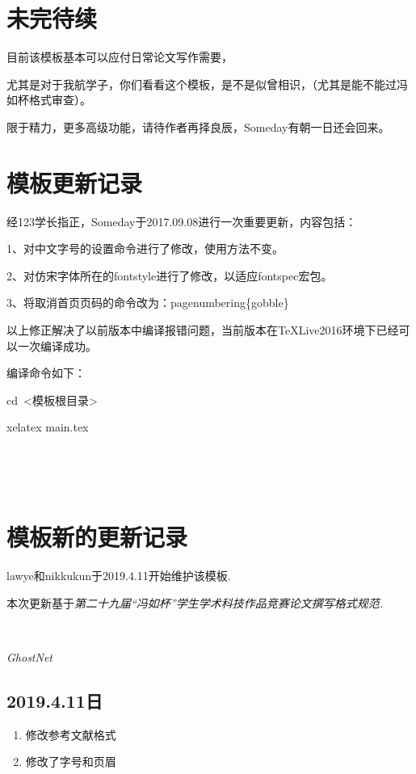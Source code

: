 

\section{未完待续}

目前该模板基本可以应付日常论文写作需要，\par
尤其是对于我航学子，你们看看这个模板，是不是似曾相识，（尤其是能不能过冯如杯格式审查）。\par
限于精力，更多高级功能，请待作者再择良辰，Someday有朝一日还会回来。

\section{模板更新记录}

经123学长指正，Someday于2017.09.08进行一次重要更新，内容包括：\par
1、对中文字号的设置命令进行了修改，使用方法不变。\par
2、对仿宋字体所在的fontstyle进行了修改，以适应fontspec宏包。\par
3、将取消首页页码的命令改为：pagenumbering\{gobble\} \par

以上修正解决了以前版本中编译报错问题，当前版本在TeXLive2016环境下已经可以一次编译成功。 \par

编译命令如下： \par
cd\ <模板根目录> \par
xelatex main.tex \par

\par \ 
\par \ 

\section{模板新的更新记录}

lawye和nikkukun于2019.4.11开始维护该模板.

本次更新基于\it{第二十九届“冯如杯”学生学术科技作品竞赛论文撰写格式规范}\cite{格式}.
\par \

\it{GhostNet}\cite{ghostnet}

\subsection{2019.4.11日}
\begin{enumerate}
    \item 修改参考文献格式
    \item 修改了字号和页眉

\end{enumerate}

